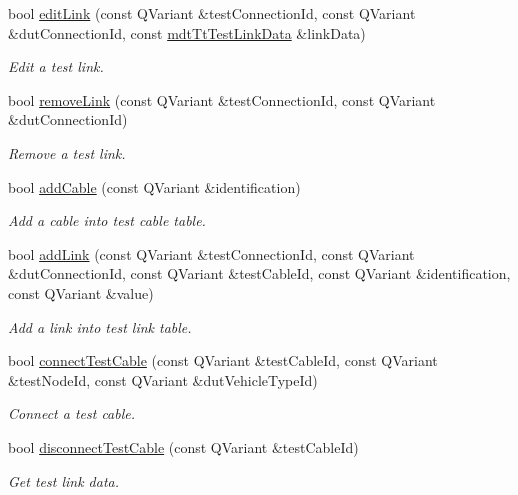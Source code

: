 \begin{DoxyCompactItemize}
bool \hyperlink{classmdt_tt_test_connection_cable_a7d2c08b218bd95e50a20f42bce242d83}{edit\-Link} (const Q\-Variant \&test\-Connection\-Id, const Q\-Variant \&dut\-Connection\-Id, const \hyperlink{classmdt_tt_test_link_data}{mdt\-Tt\-Test\-Link\-Data} \&link\-Data)
\begin{DoxyCompactList}\small\item\em Edit a test link. \end{DoxyCompactList}\item 
bool \hyperlink{classmdt_tt_test_connection_cable_a4c42bb5c2f850a53737f9e2c5f710b9f}{remove\-Link} (const Q\-Variant \&test\-Connection\-Id, const Q\-Variant \&dut\-Connection\-Id)
\begin{DoxyCompactList}\small\item\em Remove a test link. \end{DoxyCompactList}\item 
bool \hyperlink{classmdt_tt_test_connection_cable_ac7b08b2f3e644135c75c41554c06acf3}{add\-Cable} (const Q\-Variant \&identification)
\begin{DoxyCompactList}\small\item\em Add a cable into test cable table. \end{DoxyCompactList}\item 
bool \hyperlink{classmdt_tt_test_connection_cable_a0fcfed15264ef80fbb9e566aaf0df4e5}{add\-Link} (const Q\-Variant \&test\-Connection\-Id, const Q\-Variant \&dut\-Connection\-Id, const Q\-Variant \&test\-Cable\-Id, const Q\-Variant \&identification, const Q\-Variant \&value)
\begin{DoxyCompactList}\small\item\em Add a link into test link table. \end{DoxyCompactList}\item 
bool \hyperlink{classmdt_tt_test_connection_cable_ad16ab8a1aa03c5d30caa3629fae1d6d6}{connect\-Test\-Cable} (const Q\-Variant \&test\-Cable\-Id, const Q\-Variant \&test\-Node\-Id, const Q\-Variant \&dut\-Vehicle\-Type\-Id)
\begin{DoxyCompactList}\small\item\em Connect a test cable. \end{DoxyCompactList}\item 
bool \hyperlink{classmdt_tt_test_connection_cable_aab97a57059ee92e94de49dc964fb0d11}{disconnect\-Test\-Cable} (const Q\-Variant \&test\-Cable\-Id)
\begin{DoxyCompactList}\small\item\em Get test link data. \end{DoxyCompactList}\end{DoxyCompactItemize}
